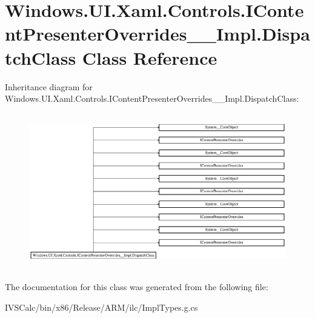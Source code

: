 \hypertarget{class_windows_1_1_u_i_1_1_xaml_1_1_controls_1_1_i_content_presenter_overrides_____impl_1_1_dispatch_class}{}\section{Windows.\+U\+I.\+Xaml.\+Controls.\+I\+Content\+Presenter\+Overrides\+\_\+\+\_\+\+Impl.\+Dispatch\+Class Class Reference}
\label{class_windows_1_1_u_i_1_1_xaml_1_1_controls_1_1_i_content_presenter_overrides_____impl_1_1_dispatch_class}
Inheritance diagram for Windows.\+U\+I.\+Xaml.\+Controls.\+I\+Content\+Presenter\+Overrides\+\_\+\+\_\+\+Impl.\+Dispatch\+Class\+:\begin{figure}[H]
\begin{center}
\leavevmode
\includegraphics[height=6.844445cm]{class_windows_1_1_u_i_1_1_xaml_1_1_controls_1_1_i_content_presenter_overrides_____impl_1_1_dispatch_class}
\end{center}
\end{figure}


The documentation for this class was generated from the following file\+:\begin{DoxyCompactItemize}
\item 
I\+V\+S\+Calc/bin/x86/\+Release/\+A\+R\+M/ilc/Impl\+Types.\+g.\+cs\end{DoxyCompactItemize}
